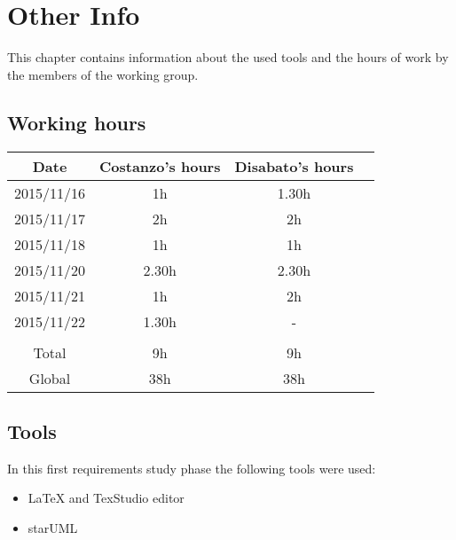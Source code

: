 \documentclass[\mainpath/main]{subfiles}
\begin{document}
\chapter{Other Info}
\label{other_info}

\setmyfancystyle

This chapter contains information about the used tools and the hours of work by the members of the working group.

\section{Working hours}
\begin{table}[h!]
\begin{tabular}{cccc}
\hline
Date & 		 Costanzo's hours & Disabato's hours  & \\ \hline
2015/11/16 & 1h 			  & 1.30h 			  & \\ \hline
2015/11/17 & 2h 			  & 2h 				  & \\ \hline 
2015/11/18 & 1h 			  & 1h 				  & \\ \hline
2015/11/20 & 2.30h 			  & 2.30h 			  & \\ \hline
2015/11/21 & 1h 			  & 2h 				  & \\ \hline
2015/11/22 & 1.30h 			  & - 				  & \\ \hline
\\
Total	   & 9h 			  & 9h 				  & \\ \hline
Global 	   & 38h 		  	  & 38h 			  & \\ \hline

\end{tabular}
\end{table}

\section{Tools}
In this first requirements study phase the following tools were used:
\begin{itemize}
	\item \LaTeX{} and TexStudio editor
	\item starUML
\end{itemize}
\end{document}
